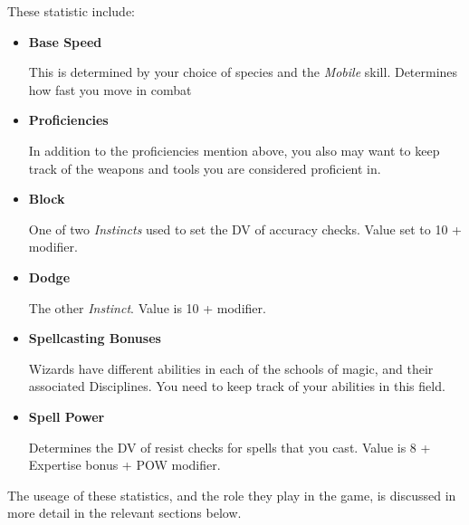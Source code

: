These statistic include:
\begin{itemize}
	\item {\bf Base Speed} 
	
	This is determined by your choice of species and the {\it Mobile} skill. Determines how fast you move in combat
	
	\item {\bf Proficiencies}
	
	In addition to the proficiencies mention above, you also may want to keep track of the weapons and tools you are considered proficient in. 
	
	\item {\bf Block}
	
	One of two {\it Instincts} used to set the DV of accuracy checks. Value set to 10 + \attPhys{} modifier.
	
	\item {\bf Dodge}
	
	The other {\it Instinct}. Value is 10 + \attFin{} modifier.
	
	\item {\bf Spellcasting Bonuses}
	
	Wizards have different abilities in each of the schools of magic, and their associated Disciplines. You need to keep track of your abilities in this field. 
	
	\item {\bf Spell Power}
	
	Determines the DV of resist checks for spells that you cast. Value is 8 + Expertise bonus + POW modifier. 
\end{itemize}

The useage of these statistics, and the role they play in the game, is discussed in more detail in the relevant sections below. 

